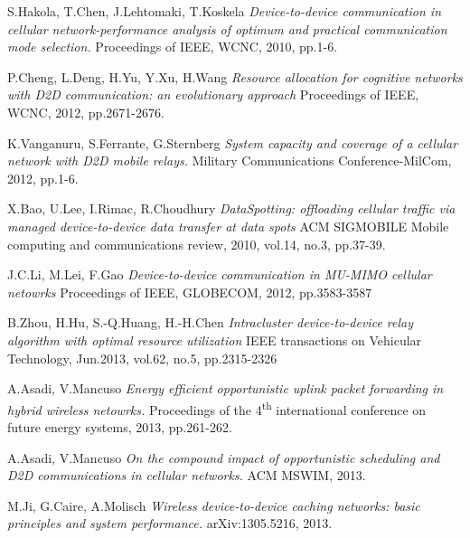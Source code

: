 \begin{thebibliography}{50}
  S.Hakola, T.Chen, J.Lehtomaki, T.Koskela
  \textit {Device-to-device communication in cellular network-performance analysis of optimum and practical communication mode selection.}
  Proceedings of IEEE, WCNC, 2010, pp.1-6.

  P.Cheng, L.Deng, H.Yu, Y.Xu, H.Wang
  \textit {Resource allocation for cognitive networks with D2D communication: an evolutionary approach}
  Proceedings of IEEE, WCNC, 2012, pp.2671-2676.

  K.Vanganuru, S.Ferrante, G.Sternberg
  \textit {System capacity and coverage of a cellular network with D2D mobile relays.}
  Military Communications Conference-MilCom, 2012, pp.1-6.

  X.Bao, U.Lee, I.Rimac, R.Choudhury
  \textit {DataSpotting: offloading cellular traffic via managed device-to-device data transfer at data spots}
  ACM SIGMOBILE Mobile computing and communications review, 2010, vol.14, no.3, pp.37-39.

  J.C.Li, M.Lei, F.Gao
  \textit {Device-to-device communication in MU-MIMO cellular netowrks}
  Proceedings of IEEE, GLOBECOM, 2012, pp.3583-3587

  B.Zhou, H.Hu, S.-Q.Huang, H.-H.Chen
  \textit {Intracluster device-to-device relay algorithm with optimal resource utilization}
  IEEE transactions on Vehicular Technology, Jun.2013, vol.62, no.5, pp.2315-2326
 
  A.Asadi, V.Mancuso
  \textit {Energy efficient opportunistic uplink packet forwarding in hybrid wireless netowrks.}
  Proceedings of the 4\textsuperscript{th} international conference on future energy systems, 2013, pp.261-262.

  A.Asadi, V.Mancuso
  \textit {On the compound impact of opportunistic scheduling and D2D communications in cellular networks.}
  ACM MSWIM, 2013.

  M.Ji, G.Caire, A.Molisch
  \textit {Wireless device-to-device caching networks: basic principles and system performance.}
  arXiv:1305.5216, 2013.

\end{thebibliography}
